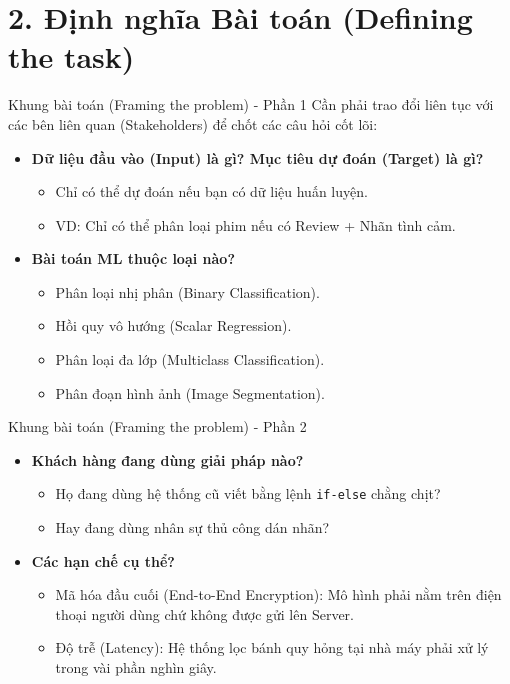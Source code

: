 \documentclass[aspectratio=169]{beamer}
\begin{document}
\section{2. Định nghĩa Bài toán (Defining the task)}

\begin{frame}{Khung bài toán (Framing the problem) - Phần 1}
    Cần phải trao đổi liên tục với các bên liên quan (Stakeholders) để chốt các câu hỏi cốt lõi:
    \begin{itemize}
        \item \textbf{Dữ liệu đầu vào (Input) là gì? Mục tiêu dự đoán (Target) là gì?}
        \begin{itemize}
            \item Chỉ có thể dự đoán nếu bạn có dữ liệu huấn luyện. 
            \item VD: Chỉ có thể phân loại phim nếu có Review + Nhãn tình cảm.
        \end{itemize}
        \item \textbf{Bài toán ML thuộc loại nào?}
        \begin{itemize}
            \item Phân loại nhị phân (Binary Classification).
            \item Hồi quy vô hướng (Scalar Regression).
            \item Phân loại đa lớp (Multiclass Classification).
            \item Phân đoạn hình ảnh (Image Segmentation).
        \end{itemize}
    \end{itemize}
\end{frame}

\begin{frame}{Khung bài toán (Framing the problem) - Phần 2}
    \begin{itemize}
        \item \textbf{Khách hàng đang dùng giải pháp nào?} 
        \begin{itemize}
            \item Họ đang dùng hệ thống cũ viết bằng lệnh \texttt{if-else} chằng chịt?
            \item Hay đang dùng nhân sự thủ công dán nhãn?
        \end{itemize}
        \item \textbf{Các hạn chế cụ thể?}
        \begin{itemize}
            \item Mã hóa đầu cuối (End-to-End Encryption): Mô hình phải nằm trên điện thoại người dùng chứ không được gửi lên Server.
            \item Độ trễ (Latency): Hệ thống lọc bánh quy hỏng tại nhà máy phải xử lý trong vài phần nghìn giây.
        \end{itemize}
    \end{itemize}
\end{frame}
\end{document}

